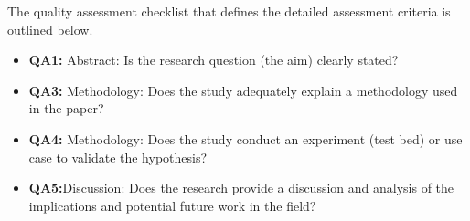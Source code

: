 The quality assessment checklist that defines the detailed assessment criteria is outlined below.
\begin{itemize}
    \item \textbf{QA1:} Abstract: Is the research question (the aim) clearly stated?
    \item \textbf{QA3:} Methodology: Does the study adequately explain a methodology used in the paper?
    \item \textbf{QA4:} Methodology: Does the study conduct an experiment (test bed) or use case to validate the hypothesis?
    \item \textbf{QA5:}Discussion: Does the research provide a discussion and analysis of the implications and potential future work in the field?
\end{itemize}

